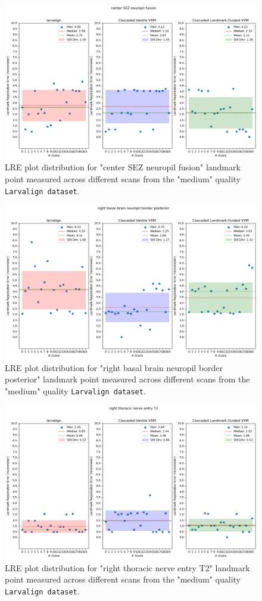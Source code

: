 \documentclass{book}
\begin{document}
	\begin{figure}[h]
		\centering
		\includegraphics[width=0.75\columnwidth]{resources/chapter5_fresh/output/center SEZ neuropil fusion.png}
		\caption{LRE plot distribution for "center SEZ neuropil fusion" landmark point measured across different scans from the "medium" quality \texttt{Larvalign dataset}.}
		\label{fig:landmark3}
	\end{figure}
	
	\begin{figure}[h]
		\centering
		\includegraphics[width=0.75\columnwidth]{resources/chapter5_fresh/output/right basal brain neuropil border posterior.png}
		\caption{LRE plot distribution for "right basal brain neuropil border posterior" landmark point measured across different scans from the "medium" quality \texttt{Larvalign dataset}.}
		\label{fig:landmark4}
	\end{figure}
	
	\begin{figure}[h]
		\centering
		\includegraphics[width=0.75\columnwidth]{resources/chapter5_fresh/output/right thoracic nerve entry T2.png}
		\caption{LRE plot distribution for "right thoracic nerve entry T2" landmark point measured across different scans from the "medium" quality \texttt{Larvalign dataset}.}
		\label{fig:landmark5}
	\end{figure}
	
\end{document}

